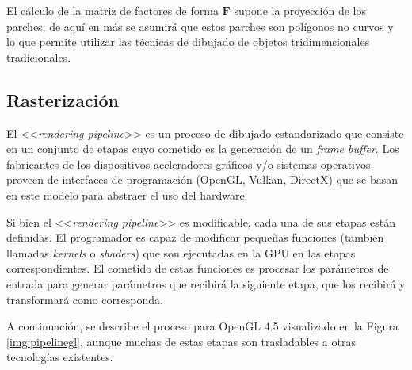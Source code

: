 El cálculo de la matriz de factores de forma $\mathbf{F}$ supone la proyección de los parches, de aquí en más se asumirá que estos parches son polígonos no curvos y lo que permite utilizar las técnicas de dibujado de objetos tridimensionales tradicionales.

\subsection{Rasterización}
\label{sec:rasterizacion}

El <<\textit{rendering pipeline}>> es un proceso de dibujado estandarizado que consiste en un conjunto de etapas cuyo cometido es la generación de un \textit{frame buffer}. Los fabricantes de los dispositivos aceleradores gráficos y/o sistemas operativos proveen de interfaces de programación (OpenGL, Vulkan, DirectX) que se basan en este modelo para abstraer el uso del hardware.

Si bien el <<\textit{rendering pipeline}>> es modificable, cada una de sus etapas están definidas.  El programador es capaz de modificar pequeñas funciones (también llamadas \textit{kernels} o \textit{shaders}) que son ejecutadas en la GPU en las etapas correspondientes. El cometido de estas funciones es procesar los parámetros de entrada para generar parámetros que recibirá la siguiente etapa, que los recibirá y transformará como corresponda.

A continuación, se describe el proceso para OpenGL 4.5 visualizado en la Figura \ref{img:pipelinegl}, aunque muchas de estas etapas son trasladables a otras tecnologías existentes.

